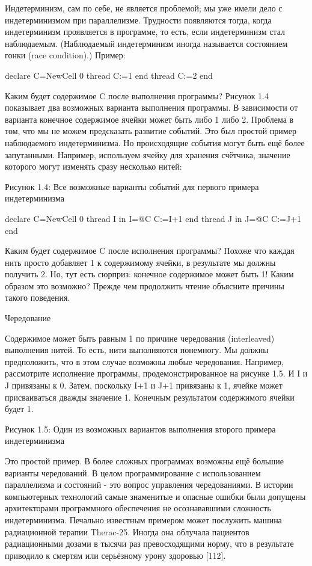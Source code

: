 Индетерминизм, сам по себе, не является проблемой; мы уже имели дело с индетерминизмом при параллелизме. Трудности появляются тогда, когда индетерминизм проявляется в программе, то есть, если индетерминизм стал наблюдаемым. (Наблюдаемый индетерминизм иногда называется состоянием гонки (race condition).) Пример:

declare
C={NewCell 0}
thread
C:=1
end
thread
C:=2
end

Каким будет содержимое C после выполнения программы? Рисунок 1.4 показывает два возможных варианта выполнения программы. В зависимости от варианта конечное содержимое ячейки может быть либо 1 либо 2. Проблема в том, что мы не можем предсказать развитие событий. Это был простой пример наблюдаемого индетерминизма. Но происходящие события могут быть ещё более запутанными. Например, используем ячейку для хранения счётчика, значение которого могут изменять сразу несколько нитей:

Рисунок 1.4: Все возможные варианты событий для первого примера индетерминизма

declare
C={NewCell 0}
thread I in
I=@C
C:=I+1
end
thread J in
J=@C
C:=J+1
end

Каким будет содержимое C после исполнения программы? Похоже что каждая нить просто добавляет 1 к содержимому ячейки, в результате мы должны получить 2. Но, тут есть сюрприз: конечное содержимое может быть 1! Каким образом это возможно? Прежде чем продолжить чтение объясните причины такого поведения.

Чередование

Содержимое может быть равным 1 по причине чередования (interleaved) выполнения нитей. То есть, нити выполняются понемногу. Мы должны предположить, что в этом случае возможны любые чередования. Например, рассмотрите исполнение программы, продемонстрированное на рисунке 1.5. И I и J привязаны к 0. Затем, поскольку I+1 и J+1 привязаны к 1, ячейке может присваиваться дважды значение 1. Конечным результатом содержимого ячейки будет 1.

Рисунок 1.5: Один из возможных вариантов выполнения второго примера индетерминизма

Это простой пример. В более сложных программах возможны ещё большие варианты чередований. В целом программирование с использованием параллелизма и состояний - это вопрос управления чередованиями. В истории компьютерных технологий самые знаменитые и опасные ошибки были допущены архитекторами программного обеспечения не осознававшими сложность индетерминизма. Печально известным примером может послужить машина радиационной терапии Therac-25. Иногда она облучала пациентов радиационными дозами в тысячи раз превосходящими норму, что в результате приводило к смертям или серьёзному урону здоровью [112].

